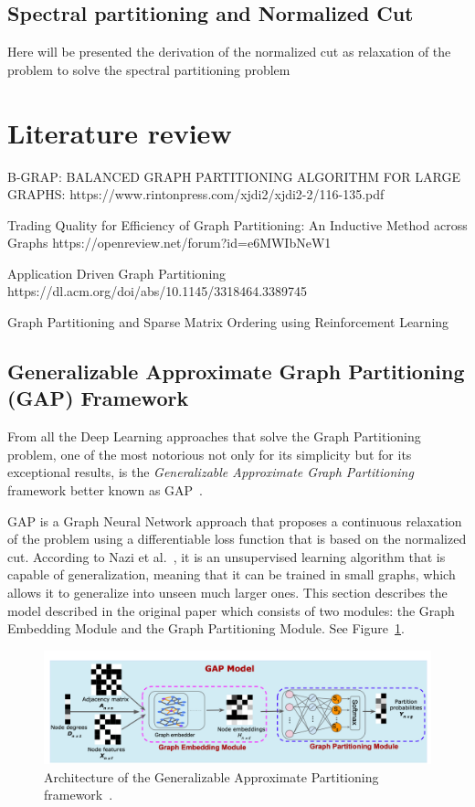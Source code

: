 
\subsection{Spectral partitioning and Normalized Cut}
Here will be presented the derivation of the normalized cut as relaxation of the problem to solve the spectral partitioning problem

\section{Literature review}

B-GRAP: BALANCED GRAPH PARTITIONING ALGORITHM
FOR LARGE GRAPHS:
https://www.rintonpress.com/xjdi2/xjdi2-2/116-135.pdf

Trading Quality for Efficiency of Graph Partitioning: An Inductive Method across Graphs 
https://openreview.net/forum?id=e6MWIbNeW1

Application Driven Graph Partitioning
https://dl.acm.org/doi/abs/10.1145/3318464.3389745

Graph Partitioning and Sparse Matrix Ordering using Reinforcement Learning~\cite{nesteddissection}


\subsection{Generalizable Approximate Graph Partitioning (GAP) Framework}
From all the Deep Learning approaches that solve the Graph Partitioning problem, one of the most notorious not only for its simplicity but for its exceptional results, is the \textit{Generalizable Approximate Graph Partitioning} framework better known as GAP~\cite{gap1}.

GAP is a Graph Neural Network approach that proposes a continuous relaxation of the problem using a differentiable loss function that is based on the normalized cut. According to Nazi et al.~\cite{gap}, it is an unsupervised learning algorithm that is capable of generalization, meaning that it can be trained in small graphs, which allows it to generalize into unseen much larger ones. This section describes the model described in the original paper which consists of two modules: the Graph Embedding Module and the Graph Partitioning Module. See Figure~\ref{fig:gap}.

\begin{figure}[h!]
    \begin{center}
        \includegraphics[scale=0.38]{GAP.png}
    \end{center}
    \caption{Architecture of the Generalizable Approximate Partitioning framework~\cite{gap}.}
    \label{fig:gap}
\end{figure}

